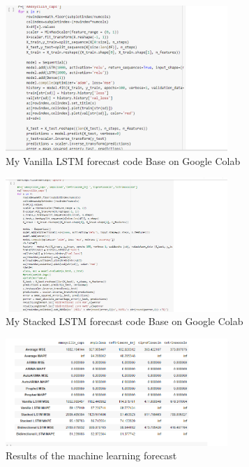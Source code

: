 \documentclass[12pt]{report}
\begin{document}
\begin{figure}[H]%
  \begin {center}
  \includegraphics[width=0.75\textwidth]{images/VanillaLSTM.PNG}
  \caption{My Vanilla LSTM forecast code Base on Google Colab}
  \label{fig:ecg}
  \end {center}
\end{figure}

\begin{figure}[H]%
  \begin {center}
  \includegraphics[width=0.75\textwidth]{images/StackedLSTM.PNG}
  \caption{My Stacked LSTM forecast code Base on Google Colab}
  \label{fig:ecg}
  \end {center}
\end{figure}


\begin{figure}[H]%
  \begin {center}
  \includegraphics[width=0.75\textwidth]{images/MSEresults.PNG}
  \caption{Results of the machine learning forecast}
  \label{fig:ecg}
  \end {center}
\end{figure}
\end{document}
